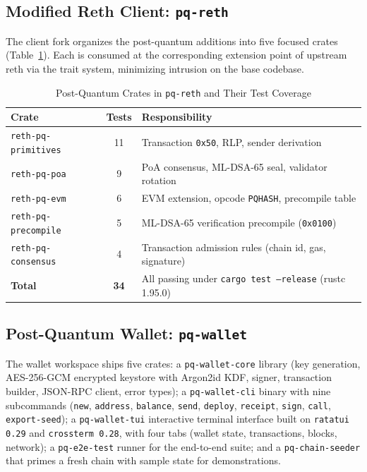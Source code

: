 \documentclass[journal,onecolumn,11pt]{IEEEtran}
\begin{document}
\subsection{Modified Reth Client: \texttt{pq-reth}}

The client fork organizes the post-quantum additions into five focused crates (Table~\ref{tab:crates}). Each is consumed at the corresponding extension point of upstream reth via the trait system, minimizing intrusion on the base codebase.

\begin{table}[!t]
\caption{Post-Quantum Crates in \texttt{pq-reth} and Their Test Coverage}
\label{tab:crates}
\centering
\begin{tabular}{@{}lcl@{}}
\toprule
\textbf{Crate} & \textbf{Tests} & \textbf{Responsibility} \\
\midrule
\texttt{reth-pq-primitives} & 11 & Transaction \texttt{0x50}, RLP, sender derivation \\
\texttt{reth-pq-poa}        & 9  & PoA consensus, ML-DSA-65 seal, validator rotation \\
\texttt{reth-pq-evm}        & 6  & EVM extension, opcode \texttt{PQHASH}, precompile table \\
\texttt{reth-pq-precompile} & 5  & ML-DSA-65 verification precompile (\texttt{0x0100}) \\
\texttt{reth-pq-consensus}  & 4  & Transaction admission rules (chain id, gas, signature) \\
\midrule
\textbf{Total} & \textbf{34} & All passing under \texttt{cargo test --release} (rustc 1.95.0) \\
\bottomrule
\end{tabular}
\end{table}

\subsection{Post-Quantum Wallet: \texttt{pq-wallet}}

The wallet workspace ships five crates: a \texttt{pq-wallet-core} library (key generation, AES-256-GCM encrypted keystore with Argon2id KDF, signer, transaction builder, JSON-RPC client, error types); a \texttt{pq-wallet-cli} binary with nine subcommands (\texttt{new}, \texttt{address}, \texttt{balance}, \texttt{send}, \texttt{deploy}, \texttt{receipt}, \texttt{sign}, \texttt{call}, \texttt{export-seed}); a \texttt{pq-wallet-tui} interactive terminal interface built on \texttt{ratatui 0.29} and \texttt{crossterm 0.28}, with four tabs (wallet state, transactions, blocks, network); a \texttt{pq-e2e-test} runner for the end-to-end suite; and a \texttt{pq-chain-seeder} that primes a fresh chain with sample state for demonstrations.
\end{document}
